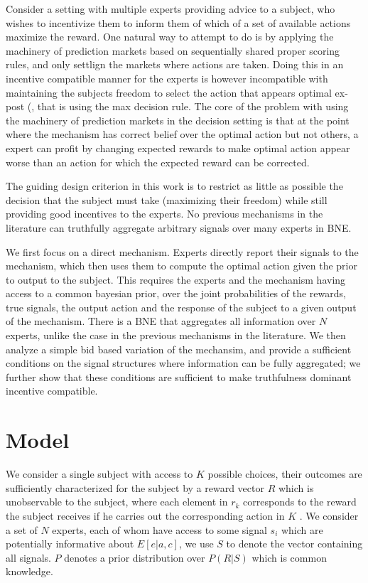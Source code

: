 
Consider a setting with multiple experts providing advice to a subject, who wishes to incentivize them to inform them of which of a set of available actions maximize the reward.
One natural way to attempt to do is by applying the machinery of prediction markets based on sequentially shared proper scoring rules, and only settlign the markets where actions are taken. Doing this in an incentive compatible manner for the experts is however incompatible with maintaining the subjects freedom to select the action that appears optimal ex-post (\cite{othman2010decision,  chen2014eliciting}, that is using the max decision rule. 
The core of the problem with using the machinery of prediction markets in the decision setting is that at the point where the mechanism has correct belief over the optimal action but not others, a expert  can profit by changing expected rewards to make optimal action appear worse than an action for which the expected reward can be corrected.


The guiding design criterion in this work is to restrict as little as possible the decision that the subject must take (maximizing their freedom) while still providing good incentives to the experts. No previous mechanisms in the literature can truthfully aggregate arbitrary signals over many experts in BNE. 

We first focus on a direct mechanism. Experts directly report their signals to the mechanism, which then uses them to compute the optimal action given the prior to output to the subject. This requires  the experts and the mechanism having access to a common bayesian prior, over the joint probabilities of the rewards, true signals, the output action and the response of the subject to a given output of the mechanism. There is a BNE that aggregates all information over $N$ experts, unlike the case in the previous mechanisms in the literature.
We then analyze a simple bid based variation of the mechansim, and provide a sufficient conditions on the signal structures where information can be fully aggregated; we further show that these conditions are sufficient to make truthfulness dominant incentive compatible.  



\section{Model}

We consider a single subject with access to $K$ possible choices, their outcomes are sufficiently characterized for the subject by a reward vector $R$ which is unobservable to the subject, where each element in $r_k$ corresponds to the reward the subject receives if he carries out the corresponding action in $K$ . We consider a set of $N$ experts, each of whom have access to some signal $s_i$ which are potentially informative about $E[e|a,c]$, we use $S$ to denote the vector containing all signals.  $P$ denotes a prior distribution over $P(R|S) $ which is common knowledge.

